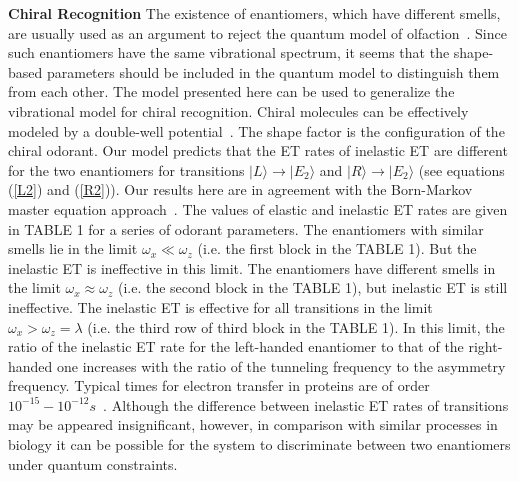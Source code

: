 \documentclass[aps,prl,tightenlines,onecolumn,superscriptaddress]{revtex4}
\begin{document}
{\bf Chiral Recognition} The existence of enantiomers, which have different smells, are usually used as an argument to reject the quantum model of olfaction~\cite{Bit}. Since such enantiomers have the same vibrational spectrum, it seems that the shape-based parameters should be included in the quantum model to distinguish them from each other. The model presented here can be used to generalize the vibrational model for chiral recognition. Chiral molecules can be effectively modeled by a double-well potential~\cite{Her}. The shape factor is the configuration of the chiral odorant. Our model predicts that the ET rates of inelastic ET are different for the two enantiomers for transitions $|L\rangle\rightarrow|E_{2}\rangle$ and $|R\rangle\rightarrow|E_{2}\rangle$ (see equations (\ref{L2}) and (\ref{R2})). Our results here are in agreement with the Born-Markov master equation approach~\cite{Tir}. The values of elastic and inelastic ET rates are given in TABLE 1 for a series of odorant parameters. The enantiomers with similar smells lie in the limit $\omega_{x}\ll\omega_{z}$ (i.e. the first block in the TABLE 1). But the inelastic ET is ineffective in this limit. The enantiomers have different smells in the limit $\omega_{x}\approx\omega_{z}$ (i.e. the second block in the TABLE 1), but inelastic ET is still ineffective. The inelastic ET is effective for all transitions in the limit $\omega_{x}>\omega_{z}=\lambda$ (i.e. the third row of third block in the TABLE 1). In this limit, the ratio of the inelastic ET rate for the left-handed enantiomer to that of the right-handed one increases with the ratio of the tunneling frequency to the asymmetry frequency. Typical times for electron transfer in proteins are of order $10^{-15}-10^{-12}s$~\cite{Bre}. Although the difference between inelastic ET rates of transitions may be appeared insignificant, however, in comparison with similar processes in biology it can be possible for the system to discriminate between two enantiomers under quantum constraints.
\end{document}
